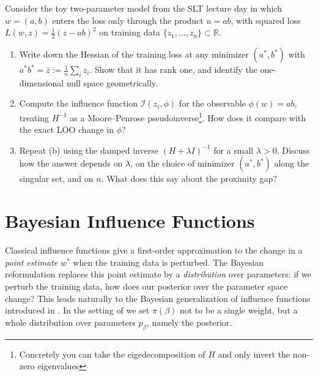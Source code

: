 \documentclass[11pt]{article}
\begin{document}
\begin{exercise}\label{ex:if-degenerate}
Consider the toy two-parameter model from the SLT lecture day in which $w = (a,b)$ enters the loss only through the product $u = ab$, with squared loss $L(w,z) = \tfrac12(z - ab)^2$ on training data $\{z_1,\dots,z_n\}\subset\mathbb{R}$.
\begin{enumerate}
  \item[(a)] Write down the Hessian of the training loss at any minimizer $(a^*,b^*)$ with $a^* b^* = \bar z := \tfrac1n\sum_i z_i$. Show that it has rank one, and identify the one-dimensional null space geometrically.
  \item[(b)] Compute the influence function $\mathcal{I}(z_i,\phi)$ for the observable $\phi(w) = ab$, treating $H^{-1}$ as a Moore--Penrose pseudoinverse\footnote{Concretely you can take the eigedecomposition of $H$ and only invert the non-zero eigenvalues}. How does it compare with the exact LOO change in $\phi$?
  \item[(c)] Repeat (b) using the damped inverse $(H + \lambda I)^{-1}$ for a small $\lambda > 0$. Discuss how the answer depends on $\lambda$, on the choice of minimizer $(a^*,b^*)$ along the singular set, and on $n$. What does this say about the proximity gap?
\end{enumerate}
\end{exercise}


\section{Bayesian Influence Functions}\label{sec:bayesian-if}

Classical influence functions give a first-order approximation to the change in a \emph{point estimate} $w^*$ when the training data is perturbed. The Bayesian reformulation replaces this point estimate by a \emph{distribution} over parameters: if we perturb the training data, how does our posterior over the parameter space change? This leads naturally to the Bayesian generalization of influence functions introduced in \citet{kreer2025bif}. In the setting of  we set $\pi(\beta)$ not to be a single weight, but a whole distribution over parameters $p_{\beta}$, namely the posterior.
\end{document}
